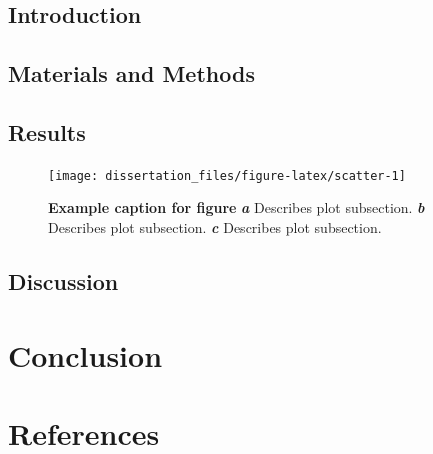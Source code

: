 \documentclass[12pt,oneside]{ucrthesis}
\begin{document}
\lipsum

\hypertarget{introduction-3}{%
\section{Introduction}\label{introduction-3}}

\lipsum

\hypertarget{materials-and-methods-2}{%
\section{Materials and Methods}\label{materials-and-methods-2}}

\lipsum

\hypertarget{results-2}{%
\section{Results}\label{results-2}}

\lipsum






\begin{figure}[h]

{\centering \texttt{[image: dissertation\_files/figure-latex/scatter-1]} 

}

\caption[This is a short caption for list of figures]{\textbf{Example caption for figure}
\textbf{\emph{a}} Describes plot subsection.
\textbf{\emph{b}} Describes plot subsection.
\textbf{\emph{c}} Describes plot subsection.}\label{fig:scatter}
\end{figure}
\hypertarget{discussion-2}{%
\section{Discussion}\label{discussion-2}}

\lipsum

\hypertarget{conclusion}{%
\chapter*{Conclusion}\label{conclusion}}


\lipsum

\backmatter
\singlespace
\setlength{\parindent}{-0.20in}
\setlength{\leftskip}{0.20in}
\setlength{\parskip}{8pt}

\hypertarget{references}{%
\chapter*{References}\label{references}}
\end{document}
